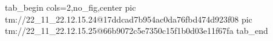  
 
 
 
 

\qqSecOrig


\ifcmt
  tab_begin cols=2,no_fig,center
    pic tm://22_11_22.12.15.24@17ddcad7b954ac0da76fbd474d923f08
    pic tm://22_11_22.12.15.25@66b9072c5e7350c15f1b0d03e11f67fa
  tab_end
\fi

